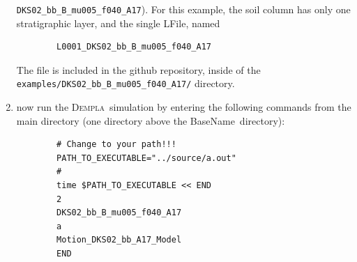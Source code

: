 \documentclass[letterpaper,11pt]{article}
\newcommand{\Dempla}{\textsc{Dempla}}
\newcommand{\BaseName}{\textsf{BaseName}}
\newcommand{\LFile}{\textsf{LFile}}
\begin{document}
\begin{enumerate}
	\texttt{DKS02\_bb\_B\_mu005\_f040\_A17}).
	For this example,
	the soil column has only one stratigraphic layer,
	and the single \LFile,
	named
	\begin{verbatim}
		L0001_DKS02_bb_B_mu005_f040_A17
	\end{verbatim}
	The file
	is included
	in the github repository, inside of the
	\texttt{examples/DKS02\_bb\_B\_mu005\_f040\_A17/} directory.
	\item
	now run the \Dempla\ simulation
	by entering the following commands from the main directory
	(one directory above the \BaseName\ directory):
	\begin{verbatim}
		# Change to your path!!!
		PATH_TO_EXECUTABLE="../source/a.out"
		#
		time $PATH_TO_EXECUTABLE << END
		2
		DKS02_bb_B_mu005_f040_A17
		a
		Motion_DKS02_bb_A17_Model
		END
	\end{verbatim}
\end{enumerate}
%
\end{document}
